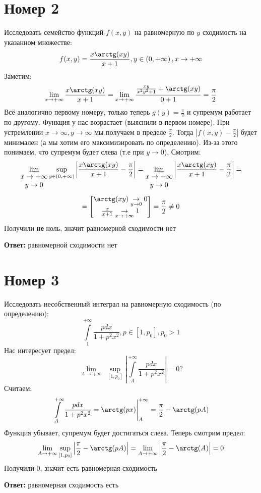 \documentclass[a4paper,12pt]{article}
\begin{document}
\section*{Номер 2}
Исследовать семейство функций $f(x, y)$ на равномерную по $y$ сходимость на указанном множестве:
\[
f(x, y) = \frac{x \arctg(xy)}{x + 1 }, y \in \left(0, + \infty \right), x \rightarrow +\infty
\]
Заметим:
\[
\lim_{x \rightarrow + \infty} \frac{x \arctg(xy)}{x + 1} = \lim_{x \rightarrow + \infty} \frac{\frac{xy}{x^2y^2 + 1} + \arctg(xy)}{0 + 1}  = \frac{\pi}{2}
\]
Всё аналогично первому номеру, только теперь $g(y) = \frac{\pi}{2}$ и супремум работает по другому. Функция у нас возрастает (выяснили в первом номере). При устремлении $x \rightarrow \infty, y \rightarrow \infty$ мы получаем в пределе $\frac{\pi}{2}$. Тогда $| f(x, y) - \frac{\pi}{2}|$ будет минимален (а мы хотим его максимизировать по определению). Из-за этого понимаем, что супремум будет слева (т.е при $y \rightarrow 0$). Смотрим:
\[
\lim_{
\begin{matrix}
x \rightarrow +\infty \\
y \rightarrow 0
\end{matrix}}
\underset{y \in (0, +\infty)}{\sup} \left|  \frac{x \arctg(xy)}{x + 1 } - \frac{\pi}{2}\right|  = 
\lim_{
\begin{matrix}
x \rightarrow +\infty \\
y \rightarrow 0
\end{matrix}}
\left|
  \frac{x \arctg(xy)}{x + 1 } - \frac{\pi}{2}
 \right| =
\]
\[
=
\begin{bmatrix}
\arctg (xy) \underset{y \rightarrow 0}{\rightarrow}0 \\
\frac{x}{x + 1} \underset{x \rightarrow +\infty}{\rightarrow} 1
\end{bmatrix} = 
 \frac{\pi}{2} \neq 0
\]
Получили \textbf{не} ноль, значит равномерной сходимости нет
\begin{center}
\textbf{Ответ: } равномерной сходимости нет
\end{center}
\clearpage

\section*{Номер 3}
Исследовать несобственный интеграл на равномерную сходимость (по определению):
\[
\int\limits_1^{+\infty} \frac{pdx}{1 + p^2x^2}, p \in [1, p_0], p_0 > 1
\]
Нас интересует предел:
\[
\lim_{A \rightarrow + \infty} \; \underset{[1, p_0]}{\sup} \left|
\int\limits_A^{+\infty}  \frac{pdx}{1 + p^2x^2}
 \right| = 0?
\]
Считаем:
\[
\int\limits_A^{+\infty}  \frac{pdx}{1 + p^2x^2} = \arctg(px) \Bigg|^{+\infty}_{A} = \frac{\pi}{2} - \arctg(pA)
\]
Функция убывает, супремум будет достигаться слева. Теперь смотрим предел:
\[
\lim_{A \rightarrow +\infty}
\underset{[1, p_0]}{\sup} \left|
 \frac{\pi}{2} - \arctg(pA) \right| =
 \lim_{A \rightarrow +\infty} \left|
 \frac{\pi}{2} - \arctg(A) \right| =
0
\]
Получили 0, значит есть равномерная сходимость
\begin{center}
\textbf{Ответ: } равномерная сходимость есть
\end{center}
\clearpage
\end{document}
